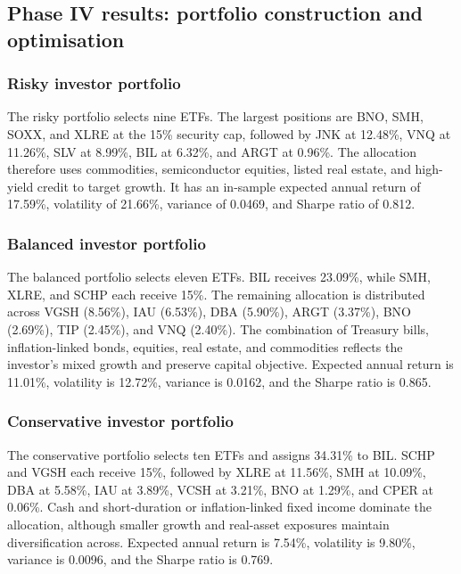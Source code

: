 \documentclass[11pt,a4paper]{article}
\begin{document}
\subsection{Phase IV results: portfolio construction and optimisation}

\subsubsection{Risky investor portfolio}

The risky portfolio selects nine ETFs. The largest positions are BNO, SMH, SOXX, and XLRE at the 15\% security cap, followed by JNK at 12.48\%, VNQ at 11.26\%, SLV at 8.99\%, BIL at 6.32\%, and ARGT at 0.96\%. The allocation therefore uses commodities, semiconductor equities, listed real estate, and high-yield credit to target growth. It has an in-sample expected annual return of 17.59\%, volatility of 21.66\%, variance of 0.0469, and Sharpe ratio of 0.812.

\subsubsection{Balanced investor portfolio}

The balanced portfolio selects eleven ETFs. BIL receives 23.09\%, while SMH, XLRE, and SCHP each receive 15\%. The remaining allocation is distributed across VGSH (8.56\%), IAU (6.53\%), DBA (5.90\%), ARGT (3.37\%), BNO (2.69\%), TIP (2.45\%), and VNQ (2.40\%). The combination of Treasury bills, inflation-linked bonds, equities, real estate, and commodities reflects the investor's mixed growth and preserve capital objective. Expected annual return is 11.01\%, volatility is 12.72\%, variance is 0.0162, and the Sharpe ratio is 0.865.

\subsubsection{Conservative investor portfolio}

The conservative portfolio selects ten ETFs and assigns 34.31\% to BIL. SCHP and VGSH each receive 15\%, followed by XLRE at 11.56\%, SMH at 10.09\%, DBA at 5.58\%, IAU at 3.89\%, VCSH at 3.21\%, BNO at 1.29\%, and CPER at 0.06\%. Cash and short-duration or inflation-linked fixed income dominate the allocation, although smaller growth and real-asset exposures maintain diversification across. Expected annual return is 7.54\%, volatility is 9.80\%, variance is 0.0096, and the Sharpe ratio is 0.769.
\end{document}
